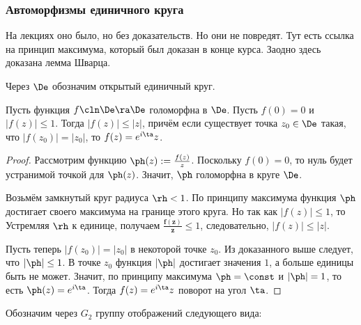 \documentclass[a4paper]{article}
\begin{document}
\subsubsection{Автоморфизмы единичного круга}

\begin{petit}
На лекциях оно было, но без доказательств. Но они не повредят. Тут есть ссылка на принцип максимума,
который был доказан в конце курса. Заодно здесь доказана лемма Шварца.
\end{petit}

Через $\De$ обозначим открытый единичный круг.

\begin{lemma}[Шварц]
Пусть функция $f\cln\De\ra\De$ голоморфна в $\De$. Пусть $f(0)=0$ и $|f(z)| \le 1$.
Тогда $|f(z)|\le |z|$, причём если существует точка $z_0\in\De$ такая, что $|f(z_0)|=|z_0|$,
то $f(z)=e^{i\ta}z$.
\end{lemma}
\begin{proof}
Рассмотрим функцию $\ph(z) := \frac{f(z)}{z}$. Поскольку $f(0)=0$, то нуль будет устранимой точкой для $\ph(z)$.
Значит, $\ph$ голоморфна в круге $\De$.

Возьмём замкнутый круг радиуса $\rh < 1$. По принципу максимума функция $\ph$ достигает своего максимума на
границе этого круга. Но так как $|f(z)| \le 1$, то
Устремляя $\rh$ к единице, получаем $\bm{\frac{f(z)}{z}} \le 1$, следовательно, $|f(z)|\le|z|$.

Пусть теперь $|f(z_0)|=|z_0|$ в некоторой точке $z_0$. Из доказанного выше следует, что $|\ph| \le 1$.
В точке $z_0$ функция $|\ph|$ достигает значения $1$, а больше единицы быть не может. Значит, по принципу максимума $\ph=\const$
и $|\ph|=1$, то есть $\ph(z) = e^{i\ta}$. Тогда $f(z) = e^{i\ta}z$ поворот на угол $\ta$.
\end{proof}

Обозначим через $G_2$ группу отображений следующего вида:
\end{document}
